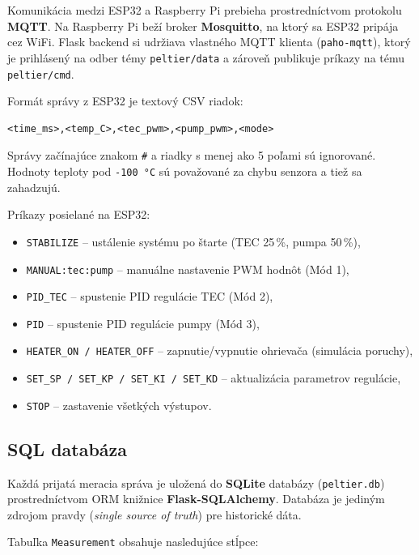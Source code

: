 Komunikácia medzi ESP32 a Raspberry Pi prebieha prostredníctvom protokolu \textbf{MQTT}.
Na Raspberry Pi beží broker \textbf{Mosquitto}, na ktorý sa ESP32 pripája cez WiFi.
Flask backend si udržiava vlastného MQTT klienta (\texttt{paho-mqtt}), ktorý je prihlásený
na odber témy \texttt{peltier/data} a zároveň publikuje príkazy na tému
\texttt{peltier/cmd}.

Formát správy z ESP32 je textový CSV riadok:
\begin{verbatim}
<time_ms>,<temp_C>,<tec_pwm>,<pump_pwm>,<mode>
\end{verbatim}
Správy začínajúce znakom \texttt{\#} a riadky s menej ako 5 poľami sú ignorované.
Hodnoty teploty pod \texttt{-100\,°C} sú považované za chybu senzora a tiež sa zahadzujú.

Príkazy posielané na ESP32:
\begin{itemize}
  \item \texttt{STABILIZE} -- ustálenie systému po štarte (TEC 25\,\%, pumpa 50\,\%),
  \item \texttt{MANUAL:tec:pump} -- manuálne nastavenie PWM hodnôt (Mód 1),
  \item \texttt{PID\_TEC} -- spustenie PID regulácie TEC (Mód 2),
  \item \texttt{PID} -- spustenie PID regulácie pumpy (Mód 3),
  \item \texttt{HEATER\_ON / HEATER\_OFF} -- zapnutie/vypnutie ohrievača (simulácia poruchy),
  \item \texttt{SET\_SP / SET\_KP / SET\_KI / SET\_KD} -- aktualizácia parametrov regulácie,
  \item \texttt{STOP} -- zastavenie všetkých výstupov.
\end{itemize}

\subsection{SQL databáza}

Každá prijatá meracia správa je uložená do \textbf{SQLite} databázy
(\texttt{peltier.db}) prostredníctvom ORM knižnice \textbf{Flask-SQLAlchemy}.
Databáza je jediným zdrojom pravdy (\textit{single source of truth}) pre historické dáta.

Tabuľka \texttt{Measurement} obsahuje nasledujúce stĺpce:

